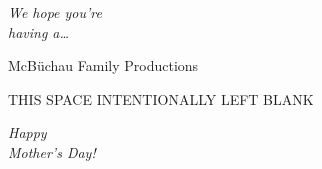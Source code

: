 \documentclass[12 pt,landscape]{article}
\begin{document}
\begin{frontcover}
\centering 
\huge
\textit{We hope you're\\
having a\ldots}
\end{frontcover}


\begin{backcover}
\centering
\vfill
McB\"{u}chau Family Productions
\vspace{.5 cm}
\end{backcover}
                                
\begin{insideleft}
\centering
\small
THIS SPACE INTENTIONALLY LEFT BLANK
\end{insideleft}

\begin{insideright}
 \begin{center} %
\Huge
\textit{Happy\\
Mother's Day!}
 \end{center}
\end{insideright}
\end{document}
